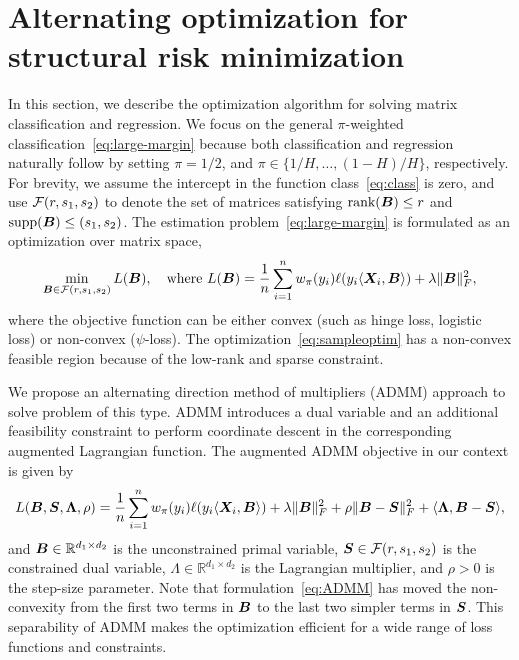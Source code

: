 \documentclass[11pt]{article}
\theoremstyle{definition}
\begin{document}
\section{Alternating optimization for  structural risk minimization}
In this section, we describe the optimization algorithm for solving matrix classification and regression. We focus on the general $\pi$-weighted classification~\eqref{eq:large-margin} because both classification and regression naturally follow by setting $\pi=1/2$, and $\pi\in\{1/H,\ldots,(1-H)/H\}$, respectively. For brevity, we assume the intercept in the function class~\eqref{eq:class} is zero, and use $\mathcal{F}(r,s_1,s_2)$ to denote the set of matrices satisfying $\text{rank}(\bm B)\leq r$ and $\text{supp}(\bm B)\leq (s_1,s_2)$. The estimation problem~\eqref{eq:large-margin} is formulated as an optimization over matrix space,
\begin{equation}\label{eq:sampleoptim}
\min_{\bm B \in \mathcal{F}(r,s_1,s_2)}L(\bm B),\quad \text{where }L(\bm B)={1\over n}\sum_{i=1}^nw_\pi(y_i)\ell(y_i\langle \bm X_i,\bm B \rangle) + \lambda\lVert\bm B\rVert_F^2,
\end{equation}
where the objective function can be either convex (such as hinge loss, logistic loss) or non-convex ($\psi$-loss). The optimization~\eqref{eq:sampleoptim} has a non-convex feasible region because of the low-rank and sparse constraint. 

We propose an alternating direction method of multipliers (ADMM) approach to solve problem of this type. ADMM introduces a dual variable and an additional feasibility constraint to perform coordinate descent in the corresponding augmented Lagrangian function. The augmented ADMM objective in our context is given by
\begin{equation}\label{eq:ADMM}
L(\bm B,\bm S,\bm{\Lambda},\rho)={1\over n}\sum_{i=1}^nw_\pi(y_i)\ell(y_i\langle \bm X_i,\bm B \rangle) + \lambda\lVert\bm B\rVert_F^2+\rho\lVert\bm B-\bm S\rVert_F^2+\langle \bm{\Lambda}, \bm B-\bm S\rangle,
\end{equation}
and $\bm B\in \mathbb{R}^{d_1\times d_2}$ is the unconstrained primal variable, $\bm S\in\mathcal{F}(r,s_1,s_2)$ is the constrained dual variable, $\Lambda\in\mathbb{R}^{d_1\times d_2}$ is the  Lagrangian multiplier, and $\rho>0$ is the step-size parameter. Note that formulation~\eqref{eq:ADMM} has moved the non-convexity from the first two terms in $\bm B$ to the last two simpler terms in $\bm S$. This separability of ADMM makes the optimization efficient for a wide range of loss functions and constraints. 
\end{document}
